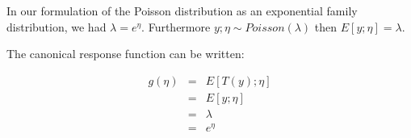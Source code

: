 \begin{answer}
In our formulation of the Poisson distribution as an exponential family distribution, we had $\lambda =  e^{\eta}$. Furthermore $y;\eta \sim Poisson(\lambda )$ then $E[y;\eta] = \lambda $.

The canonical response function can be written:

\begin{eqnarray*}
  g(\eta)&=& E[T(y);\eta]\\
  &=& E[y;\eta]\\
  &=& \lambda\\
  &=& e^{\eta}
\end{eqnarray*}

\end{answer}
